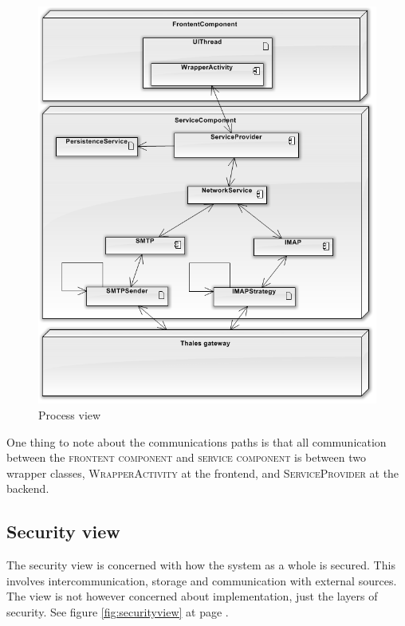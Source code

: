 \begin{figure}[H]
	\includegraphics[width=\textwidth]{processview.png}
	\caption{Process view}
	\label{fig:processview}
\end{figure}

One thing to note about the communications paths is that all communication between the \textsc{frontent component} and \textsc{service component} is between two wrapper classes, \textsc{WrapperActivity} at the frontend, and \textsc{ServiceProvider} at the backend. 

\subsection{Security view}
The security view is concerned with how the system as a whole is secured. This involves intercommunication, storage and communication with external sources. The view is not however concerned about implementation, just the layers of security.
See figure \ref{fig:securityview} at page \pageref{fig:securityview}.

